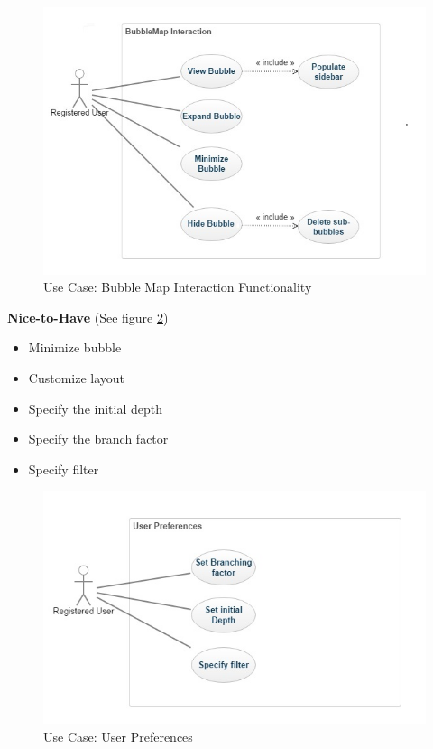 \documentclass[hidelinks,english]{article}
\begin{document}
			\begin{figure}[!h]
				\includegraphics[width=\linewidth]{BubbleMap Interaction.jpg}
				\caption{Use Case: Bubble Map Interaction Functionality}
				\label{UseCaseBubbleMapInteraction}
			\end{figure}
			
			\textbf{Nice-to-Have} (See figure \ref{UseCaseUserPreferences})
			\begin{itemize}
			    \item Minimize bubble
			    \item Customize layout
				\item Specify the initial depth
			    \item Specify the branch factor
			    \item Specify filter
			\end{itemize}
			\begin{figure}[!h]
				\includegraphics[width=\linewidth]{User Preferences.jpg}
				\caption{Use Case: User Preferences}
				\label{UseCaseUserPreferences}
			\end{figure}
		
\end{document}
